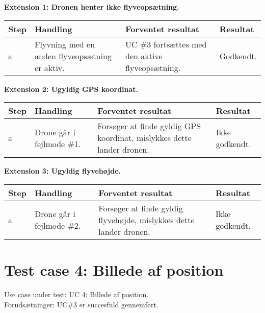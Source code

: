 \textbf{Extension 1: Dronen henter ikke flyveopsætning.}
\begin{table}[H]
	\centering
		\begin{tabular}{|l|p{5 cm}|p{5 cm}|p{2.5 cm}|}
		\hline
			\textbf{Step} & \textbf{Handling} & \textbf{Forventet resultat} & \textbf{Resultat} \\ \hline
			a & Flyvning med en anden flyveopsætning er aktiv. & UC \#3 fortsættes med den aktive flyveopsætning. & Godkendt. \\ \hline
		\end{tabular}
\end{table}

\textbf{Extension 2: Ugyldig GPS koordinat.}
\begin{table}[H]
	\centering
		\begin{tabular}{|l|p{5 cm}|p{5 cm}|p{2.5 cm}|} 
		\hline
			\textbf{Step} & \textbf{Handling} & \textbf{Forventet resultat} & \textbf{Resultat} \\ \hline
			a & Drone går i fejlmode \#1. & Forsøger at finde gyldig GPS koordinat, mislykkes dette lander dronen. & Ikke godkendt.\\ \hline
		\end{tabular}
\end{table}

\textbf{Extension 3: Ugyldig flyvehøjde.}
\begin{table}[H]
	\centering
		\begin{tabular}{|l|p{5 cm}|p{5 cm}|p{2.5 cm}|}
		\hline
			\textbf{Step} & \textbf{Handling} & \textbf{Forventet resultat} & \textbf{Resultat} \\ \hline
			a & Drone går i fejlmode \#2. & Forsøger at finde gyldig \newline flyvehøjde, mislykkes dette lander dronen. & Ikke godkendt. \\ \hline
		\end{tabular}
\end{table}

\newpage

\section{Test case 4: Billede af position}
Use case under test: UC 4: Billede af position.\\
Forudsætninger:	UC\#3 er succesfuld gennemført.

